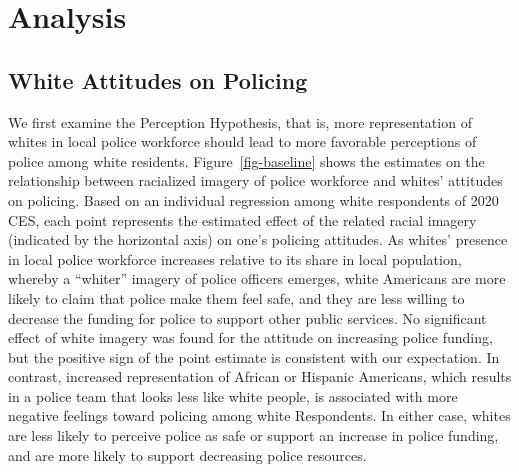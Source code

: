\documentclass[
  12pt,
]{article}
\begin{document}
\hypertarget{analysis}{%
\section{Analysis}\label{analysis}}

\hypertarget{white-attitudes-on-policing}{%
\subsection{White Attitudes on
Policing}\label{white-attitudes-on-policing}}

We first examine the Perception Hypothesis, that is, more representation
of whites in local police workforce should lead to more favorable
perceptions of police among white residents. Figure~\ref{fig-baseline}
shows the estimates on the relationship between racialized imagery of
police workforce and whites' attitudes on policing. Based on an
individual regression among white respondents of 2020 CES, each point
represents the estimated effect of the related racial imagery (indicated
by the horizontal axis) on one's policing attitudes. As whites' presence
in local police workforce increases relative to its share in local
population, whereby a ``whiter'' imagery of police officers emerges,
white Americans are more likely to claim that police make them feel
safe, and they are less willing to decrease the funding for police to
support other public services. No significant effect of white imagery
was found for the attitude on increasing police funding, but the
positive sign of the point estimate is consistent with our expectation.
In contrast, increased representation of African or Hispanic Americans,
which results in a police team that looks less like white people, is
associated with more negative feelings toward policing among white
Respondents. In either case, whites are less likely to perceive police
as safe or support an increase in police funding, and are more likely to
support decreasing police resources.
\end{document}
